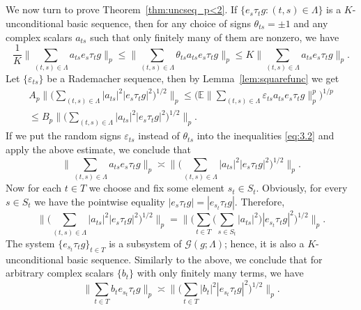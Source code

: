 \documentclass[reqno,a4paper,12pt]{amsart}
\numberwithin{equation}{section}
\numberwithin{figure}{section}
\newcommand\G{\mathcal{G}}
\newcommand\1{\mathds{1}}
\newcommand\eps{\varepsilon}
\newcommand{\E}{\mathbb{E}}
\newcommand{\TTT}{T}
\newcommand{\SSS}{S}
\newcommand{\ts}{\tau}
\renewcommand\le{\leqslant}
\theoremstyle{plain}
\newcommand{\thmref}[1]{Theorem~\ref{#1}}
\newcommand{\lemref}[1]{Lemma~\ref{#1}}
\theoremstyle{definition}
\begin{document}
\subsection{}
We now turn to prove \thmref{thm:uncseq_p<2}. If $\{e_s \ts_t g: (t,s)\in\Lambda\}$ is a $K$-unconditional basic sequence, then for any choice of signs $\theta_{ts}=\pm 1$ and any complex scalars $a_{ts}$ such that only finitely many of them are nonzero, we have
\begin{equation}\label{eq:3.2}
\frac{1}{K}\Big\|\sum_{(t,s)\in\Lambda}  a_{ts} e_s \ts_t g\Big\|_p\le \Big\|\sum_{(t,s)\in\Lambda} \theta_{ts} a_{ts} e_s \ts_t g\Big\|_p\le K 	\Big\|\sum_{(t,s)\in\Lambda}  a_{ts} e_s \ts_t g\Big\|_p.
\end{equation}
Let $\{ \eps_{ts} \}$ be a Rademacher sequence, then by \lemref{lem:squarefunc} we get
\begin{gather}
A_p\Big\| \Big( \sum_{(t,s)\in \Lambda}  |a_{ts}|^2  |e_s \ts_t g|^2 \Big)^{1/2} \Big\|_p \le \Big(\E \Big\|\sum_{(t,s)\in\Lambda} \eps_{ts} a_{ts} e_s \ts_t g\Big\|^p_p\Big)^{1/p} \\
\le B_p \Big\| \Big( \sum_{(t,s)\in \Lambda}  |a_{ts}|^2  |e_s \ts_t g|^2 \Big)^{1/2} \Big\|_p.
\end{gather}
If we put the random signs $\eps_{ts}$ instead of $\theta_{ts}$ into the inequalities \eqref{eq:3.2} and apply the above estimate, we conclude that 
\begin{equation}
\Big\|\sum_{(t,s)\in\Lambda}  a_{ts} e_s \ts_t g\Big\|_p \asymp \Big\| \Big( \sum_{(t,s)\in \Lambda}  |a_{ts}|^2  |e_s \ts_t g|^2 \Big)^{1/2} \Big\|_p.
\end{equation}
Now for each $t\in \TTT$ we choose and fix some element $s_t\in \SSS_t$. Obviously, for every $s\in \SSS_t$ we have the pointwise equality $|e_s \ts_tg| = |e_{s_t} \ts_tg|$. Therefore, 
\begin{equation}
\Big\| \Big( \sum_{(t,s)\in \Lambda}  |a_{ts}|^2  |e_s \ts_t g|^2 \Big)^{1/2} \Big\|_p = \Big\|\Big( \sum_{t\in \TTT} \Big( \sum_{s\in \SSS_t} |a_{ts}|^2 \Big)  |e_{s_t} \ts_t g|^2 \Big)^{1/2}\Big\|_p.
\end{equation}
The system $\{e_{s_t } \tau_t g\}_{t\in \TTT}$ is a subsystem of $\G(g;\Lambda)$; hence, it is also a $K$-unconditional basic sequence. Similarly to the above, we conclude that for arbitrary complex scalars $\{b_t\}$ with only finitely many terms, we have
\begin{equation}
\Big\| \sum_{t\in \TTT} b_t e_{s_t} \ts_t g \Big\|_p\asymp \Big\| \Big(\sum_{t\in \TTT} |b_t|^2  |e_{s_t} \ts_t g|^2 \Big)^{1/2} \Big\|_p.
\end{equation}
\end{document}
